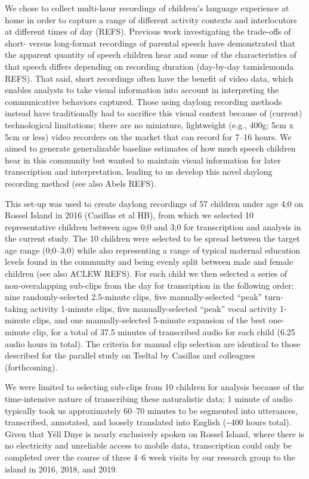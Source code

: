 \documentclass[,man,floatsintext]{apa6}
\begin{document}
We chose to collect multi-hour recordings of children's language
experience at home in order to capture a range of different activity
contexts and interlocutors at different times of day (REFS). Previous
work investigating the trade-offs of short- versus long-format
recordings of parental speech have demonstrated that the apparent
quantity of speech children hear and some of the characteristics of that
speech differs depending on recording duration (day-by-day tamislemonda
REFS). That said, short recordings often have the benefit of video data,
which enables analysts to take visual information into account in
interpreting the communicative behaviors captured. Those using daylong
recording methods instead have traditionally had to sacrifice this
visual context because of (current) technological limitations; there are
no miniature, lightweight (e.g., 400g; 5cm x 5cm or less) video
recorders on the market that can record for 7--16 hours. We aimed to
generate generalizable baseline estimates of how much speech children
hear in this community but wanted to maintain visual information for
later transcription and interpretation, leading to us develop this novel
daylong recording method (see also Abels REFS).

This set-up was used to create daylong recordings of 57 children under
age 4;0 on Rossel Island in 2016 (Casillas et al HB), from which we
selected 10 representative children between ages 0;0 and 3;0 for
transcription and analysis in the current study. The 10 children were
selected to be spread between the target age range (0;0--3;0) while also
representing a range of typical maternal education levels found in the
community and being evenly split between male and female children (see
also ACLEW REFS). For each child we then selected a series of
non-overalapping sub-clips from the day for transription in the
following order: nine randomly-selected 2.5-minute clips, five
manually-selected \enquote{peak} turn-taking activity 1-minute clips,
five manually-selected \enquote{peak} vocal activity 1-minute clips, and
one manually-selected 5-minute expansion of the best one-minute clip,
for a total of 37.5 minutes of transcribed audio for each child (6.25
audio hours in total). The criteria for manual clip selection are
identical to those described for the parallel study on Tseltal by
Casillas and colleagues (forthcoming).

We were limited to selecting sub-clips from 10 children for analysis
because of the time-intensive nature of transcribing these naturalistic
data; 1 minute of audio typically took us approximately 60--70 minutes
to be segmented into utterances, transcribed, annotated, and loosely
translated into English (\textasciitilde{}400 hours total). Given that
Yélî Dnye is nearly exclusively spoken on Rossel Island, where there is
no electricity and unreliable access to mobile data, transcription could
only be completed over the course of three 4--6 week visits by our
research group to the island in 2016, 2018, and 2019.
\end{document}
